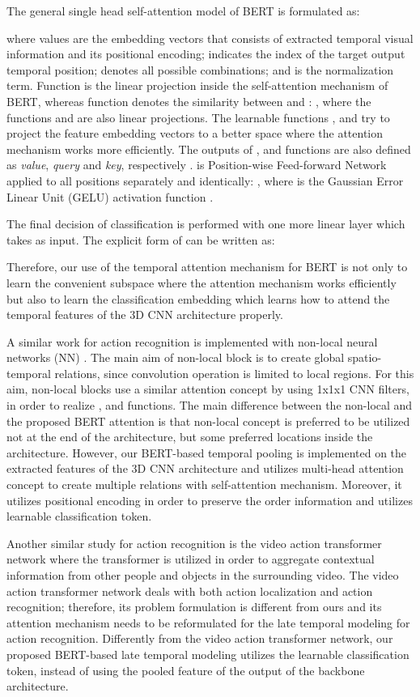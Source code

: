 \documentclass[runningheads]{llncs}
\begin{document}
The general single head self-attention model of BERT is formulated as:

where  values are the embedding vectors that consists of extracted temporal visual information and its positional encoding;   indicates the index of the target output temporal position;  denotes all possible combinations; and  is the normalization term. Function  is the linear projection inside the self-attention mechanism of BERT, whereas  function  denotes the similarity between  and : , where the functions  and  are also linear projections. The learnable functions ,  and  try to project the feature embedding vectors to a better space where the attention mechanism works more efficiently. The outputs of ,  and  functions are also defined as \textit{value}, \textit{query} and \textit{key}, respectively \cite{Vaswani2017}.  is Position-wise Feed-forward Network applied to all positions separately and identically: , where  is the Gaussian Error Linear Unit (GELU) activation function \cite{Hendrycks2016GaussianGELUs}.

The final decision of classification is performed with one more linear layer which takes  as input. The explicit form of  can be written as:

Therefore, our use of the temporal attention mechanism for BERT is not only to learn the convenient subspace where the attention mechanism works efficiently but also to learn the classification embedding which learns how to attend the temporal features of the 3D CNN architecture properly.

A similar work for action recognition is implemented with non-local neural networks (NN) \cite{Wang2018a}. The main aim of non-local block is to create global spatio-temporal relations, since convolution operation is limited to local regions. For this aim, non-local blocks use a similar attention concept by using 1x1x1 CNN filters, in order to realize ,  and  functions. The main difference between the non-local and the proposed BERT attention is that non-local concept \cite{Wang2018a} is preferred to be utilized not at the end of the architecture, but some preferred locations inside the architecture. However, our BERT-based temporal pooling is implemented on the extracted features of the 3D CNN architecture and utilizes multi-head attention concept to create multiple relations with self-attention mechanism. Moreover, it utilizes positional encoding in order to preserve the order information and utilizes learnable classification token.

Another similar study for action recognition is the video action transformer network \cite{Girdhar2018} where the transformer is utilized in order to aggregate contextual information from other people and objects in the surrounding video. The video action transformer network deals with both action localization and action recognition; therefore, its problem formulation is different from ours and its attention mechanism needs to be reformulated for the late temporal modeling for action recognition. Differently from the video action transformer network, our proposed BERT-based late temporal modeling utilizes the learnable classification token, instead of using the pooled feature of the output of the backbone architecture.
\end{document}
